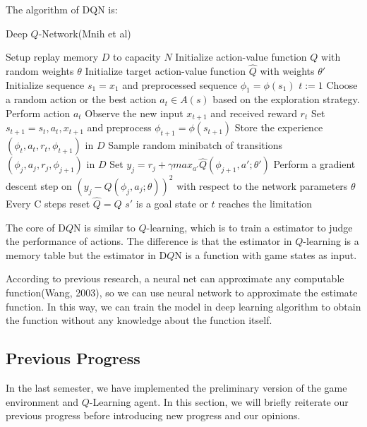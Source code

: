 \documentclass[12pt]{article}
\begin{document}
The algorithm of DQN is:
\begin{algorithm}[H]
    \caption{Deep $Q$-Network(Mnih et al)}\label{euclid}
    \begin{algorithmic}[1]
    \State Setup replay memory $D$ to capacity $N$
    \State Initialize action-value function $Q$ with random weights $\theta$
    \State Initialize target action-value function $\hat{Q}$ with weights $\theta'$
        \State Initialize sequence $s_1 = {x_1}$ and preprocessed sequence $\phi_1 = \phi(s_1)$
        \State $t := 1$
        \Repeat
            \State Choose a random action or the best action $a_t \in A(s)$ based on the exploration strategy.
            \State Perform action $a_t$
            \State Observe the new input $x_{t+1}$ and received reward $r_t$
            \State Set $s_{t+1} = s_t,a_t,x_{t+1}$ and preprocess $\phi_{t+1} = \phi(s_{t+1})$
            \State Store the experience $(\phi_t, a_t, r_t, \phi_{t+1})$ in $D$
            \State Sample random minibatch of transitions $(\phi_j, a_j, r_j, \phi_{j+1})$ in $D$
            \State Set $y_j = r_j + \gamma max_{a'} \hat{Q}(\phi_{j+1},a'; \theta')$
            \State Perform a gradient descent step on $(y_j - Q(\phi_j, a_j; \theta))^2$ with respect to the network parameters $\theta$
            \State Every C steps reset $\hat{Q} = Q$ 
        \Until $s'$ is a goal state or $t$ reaches the limitation
    \EndFor
    \end{algorithmic}
\end{algorithm}

The core of D$Q$N is similar to $Q$-learning, which is to train a estimator to judge the performance of actions. The difference is that the estimator in $Q$-learning is a memory table but the estimator in D$Q$N is a function with game states as input.

According to previous research, a neural net can approximate any computable function(Wang, 2003), so we can use neural network to approximate the estimate function. In this way, we can train the model in deep learning algorithm to obtain the function without any knowledge about the function itself.

\subsection{Previous Progress}
In the last semester, we have implemented the preliminary version of the game environment and $Q$-Learning agent. In this section, we will briefly reiterate our previous progress before introducing new progress and our opinions.
\end{document}
